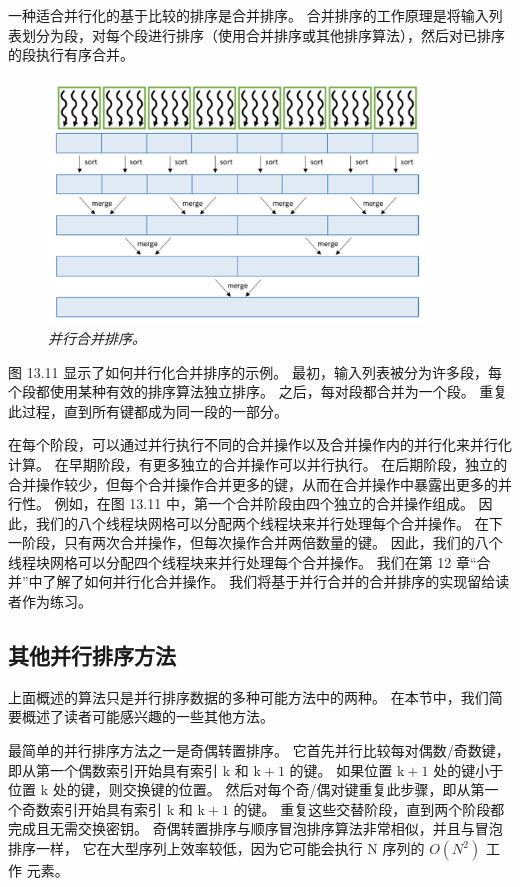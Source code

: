 一种适合并行化的基于比较的排序是合并排序。 
合并排序的工作原理是将输入列表划分为段，对每个段进行排序（使用合并排序或其他排序算法），然后对已排序的段执行有序合并。

\begin{figure}[H]
	\centering
	\includegraphics[width=0.9\textwidth]{figs/F13.11.png}
	\caption{\textit{并行合并排序。}}
\end{figure}

图 13.11 显示了如何并行化合并排序的示例。 最初，输入列表被分为许多段，每个段都使用某种有效的排序算法独立排序。 
之后，每对段都合并为一个段。 重复此过程，直到所有键都成为同一段的一部分。

在每个阶段，可以通过并行执行不同的合并操作以及合并操作内的并行化来并行化计算。 
在早期阶段，有更多独立的合并操作可以并行执行。 
在后期阶段，独立的合并操作较少，但每个合并操作合并更多的键，从而在合并操作中暴露出更多的并行性。 
例如，在图 13.11 中，第一个合并阶段由四个独立的合并操作组成。 
因此，我们的八个线程块网格可以分配两个线程块来并行处理每个合并操作。 
在下一阶段，只有两次合并操作，但每次操作合并两倍数量的键。 
因此，我们的八个线程块网格可以分配四个线程块来并行处理每个合并操作。 我们在第 12 章“合并”中了解了如何并行化合并操作。 
我们将基于并行合并的合并排序的实现留给读者作为练习。

\subsection{其他并行排序方法}
上面概述的算法只是并行排序数据的多种可能方法中的两种。 在本节中，我们简要概述了读者可能感兴趣的一些其他方法。

最简单的并行排序方法之一是奇偶转置排序。 它首先并行比较每对偶数/奇数键，
即从第一个偶数索引开始具有索引 $\mathrm{k}$ 和 $\mathrm{k}+1$ 的键。 
如果位置 $\mathrm{k}+1$ 处的键小于位置 $\mathrm{k}$ 处的键，则交换键的位置。 
然后对每个奇/偶对键重复此步骤，即从第一个奇数索引开始具有索引 $\mathrm{k}$ 和 $\mathrm{k}+1$ 的键。 
重复这些交替阶段，直到两个阶段都完成且无需交换密钥。 
奇偶转置排序与顺序冒泡排序算法非常相似，并且与冒泡排序一样，
它在大型序列上效率较低，因为它可能会执行 N 序列的 $O\left(N^{2}\right)$ 工作  元素。

